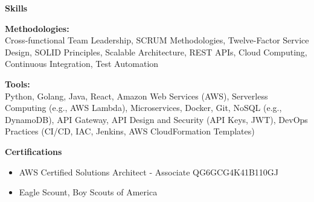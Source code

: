 \documentclass[10pt]{article}
\begin{document}
  \vspace{0.5em}
  {\large \textbf{Skills}}

  \begin{flushleft}
    \addtolength{\leftskip}{.3in}

    \textbf{Methodologies:}\\
    Cross-functional Team Leadership, SCRUM Methodologies, Twelve-Factor Service Design, SOLID Principles, Scalable Architecture, REST APIs, Cloud Computing, Continuous Integration, Test Automation

    \vspace{0.5em}

    \textbf{Tools:}\\
    Python, Golang, Java, React, Amazon Web Services (AWS), Serverless Computing (e.g., AWS Lambda), Microservices, Docker, Git, NoSQL (e.g., DynamoDB), API Gateway, API Design and Security (API Keys, JWT), DevOps Practices (CI/CD, IAC, Jenkins, AWS CloudFormation Templates)
  \end{flushleft}

  \vspace{0.5em}
  {\large \textbf{Certifications}}
  \begin{itemize}
      
      \item AWS Certified Solutions Architect - Associate QG6GCG4K41B110GJ
      
      \item Eagle Scount, Boy Scouts of America
      
  \end{itemize}
\end{document}
